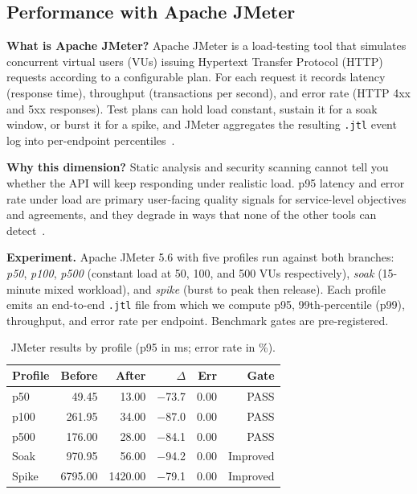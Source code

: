 \documentclass[conference,letterpaper]{IEEEtran}
\begin{document}
\subsection{Performance with Apache JMeter}\label{sec:jmeter}
\textbf{What is Apache JMeter?} Apache JMeter is a load-testing tool that simulates concurrent virtual users (VUs) issuing Hypertext Transfer Protocol (HTTP) requests according to a configurable plan. For each request it records latency (response time), throughput (transactions per second), and error rate (HTTP 4xx and 5xx responses). Test plans can hold load constant, sustain it for a soak window, or burst it for a spike, and JMeter aggregates the resulting \texttt{.jtl} event log into per-endpoint percentiles~\cite{ref20}.

\textbf{Why this dimension?} Static analysis and security scanning cannot tell you whether the API will keep responding under realistic load. p95 latency and error rate under load are primary user-facing quality signals for service-level objectives and agreements, and they degrade in ways that none of the other tools can detect~\cite{ref20,ref21}.

\textbf{Experiment.} Apache JMeter 5.6 with five profiles run against both branches: \emph{p50}, \emph{p100}, \emph{p500} (constant load at 50, 100, and 500 VUs respectively), \emph{soak} (15-minute mixed workload), and \emph{spike} (burst to peak then release). Each profile emits an end-to-end \texttt{.jtl} file from which we compute p95, 99th-percentile (p99), throughput, and error rate per endpoint. Benchmark gates are pre-registered.

\begin{table}[t]
\caption{JMeter results by profile (p95 in ms; error rate in \%).}
\label{tab:jmeter}
\centering
\scriptsize
\setlength{\tabcolsep}{2.5pt}
\begin{tabular}{@{}lrrrrr@{}}
\toprule
Profile & Before & After & $\Delta$ & Err & Gate \\
\midrule
p50    &    49.45 &   13.00 & $-$73.7 & 0.00 & PASS \\
p100   &   261.95 &   34.00 & $-$87.0 & 0.00 & PASS \\
p500   &   176.00 &   28.00 & $-$84.1 & 0.00 & PASS \\
Soak   &   970.95 &   56.00 & $-$94.2 & 0.00 & Improved\footnotemark[2] \\
Spike  &  6795.00 & 1420.00 & $-$79.1 & 0.00 & Improved\footnotemark[2] \\
\bottomrule
\end{tabular}
\end{table}
\end{document}

